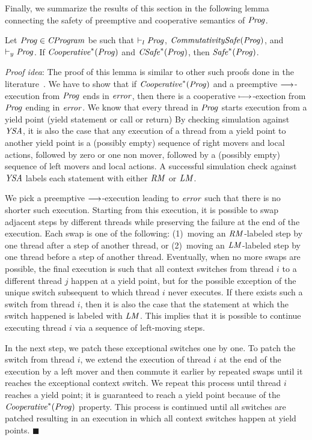 Finally, we summarize the results of this section in the following lemma connecting the safety
of preemptive and cooperative semantics of $\mathit{Prog}$.
\begin{lemma}
\label{lemma:preemptive-to-cooperative}
Let $\mathit{Prog} \in \mathit{CProgram}$ be such that $\vdash_l \mathit{Prog}$, $\mathit{CommutativitySafe}(\mathit{Prog})$, and $\vdash_y \mathit{Prog}$.
If $\mathit{Cooperative}^*(\mathit{Prog})$ and $\mathit{CSafe}^*(\mathit{Prog})$, then $\mathit{Safe}^*(\mathit{Prog})$.
\end{lemma}
{\em Proof idea}:
The proof of this lemma is similar to other such proofs done in the literature~\cite{FlanaganFLQ08,ElmasQT09}.
We have to show that if $\mathit{Cooperative}^*(\mathit{Prog})$ and a preemptive $\longrightarrow$-execution from $\mathit{Prog}$ ends in $\mathit{error}$,
then there is a cooperative $\longmapsto$-exection from $\mathit{Prog}$ ending in $\mathit{error}$.
We know that every thread in $\mathit{Prog}$ starts execution from a yield point (yield statement or call or return)
By checking simulation against $\mathit{YSA}$, it is also the case that any execution of a thread from a yield point to 
another yield point is a (possibly empty) sequence of right movers and local actions, followed by zero or one non mover, 
followed by a (possibly empty) sequence of left movers and local actions.
A successful simulation check against $\mathit{YSA}$ labels each statement with either $\mathit{RM}$ or $\mathit{LM}$.

We pick a preemptive $\longrightarrow$-execution leading to $\mathit{error}$ such that there is no shorter such execution.
Starting from this execution, it is possible to swap adjacent steps by different threads while 
preserving the failure at the end of the execution.
Each swap is one of the following: 
(1)~moving an $\mathit{RM}$-labeled step by one thread after a step of another thread, or 
(2)~moving an $\mathit{LM}$-labeled step by one thread before a step of another thread.
Eventually, when no more swaps are possible, the final execution is such that all context switches from thread $i$ to a different 
thread $j$ happen at a yield point, but for the possible exception of the unique switch subsequent to which thread $i$ never executes.
If there exists such a switch from thread $i$, then it is also the case that the statement at which the switch happened is labeled with $\mathit{LM}$.
This implies that it is possible to continue executing thread $i$ via a sequence of left-moving steps.

In the next step, we patch these exceptional switches one by one.
To patch the switch from thread $i$, we extend the execution of thread $i$ at the end of the execution by a left mover and then commute it earlier by repeated swaps 
until it reaches the exceptional context switch.
We repeat this process until thread $i$ reaches a yield point; it is guaranteed to reach a yield point because of the $\mathit{Cooperative}^*(\mathit{Prog})$ property.
This process is continued until all switches are patched resulting in an execution in which all context switches happen at yield points.
$\blacksquare$
